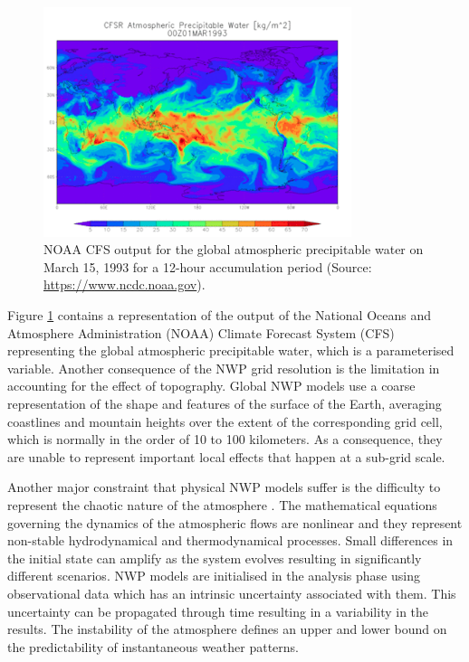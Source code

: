 \begin{figure}[h]
 \centerline{\includegraphics[width=9cm]{CFS.png}} \caption{NOAA CFS output for the global atmospheric precipitable water on March 15, 1993 for a 12-hour accumulation period (Source: \url{https://www.ncdc.noaa.gov}).}\label{CFS}
\end{figure}

Figure \ref{CFS} contains a representation of the output of the National Oceans and Atmosphere Administration (NOAA) Climate Forecast System (CFS) representing  the global atmospheric precipitable water, which is a parameterised variable. Another consequence of the NWP grid resolution is the limitation in accounting for the effect of topography. Global NWP models use a coarse representation of the shape and features of the surface of the Earth, averaging coastlines and mountain heights over the extent of the corresponding grid cell, which is normally in the order of 10 to 100 kilometers. As a consequence, they are unable to represent important local effects that happen at a sub-grid scale.

\medskip

Another major constraint that physical NWP models suffer is the difficulty to represent the chaotic nature of the atmosphere \citep{lorenz1982atmospheric}. The mathematical equations governing the dynamics of the atmospheric flows are nonlinear and they represent non-stable hydrodynamical and thermodynamical processes. Small differences in the initial state can amplify as the system evolves resulting in significantly different scenarios. NWP models are initialised in the analysis phase using observational data which has an intrinsic uncertainty associated with them. This uncertainty can be propagated through time resulting in a variability in the results. The instability of the atmosphere defines an upper and lower bound on the predictability of instantaneous weather patterns.

